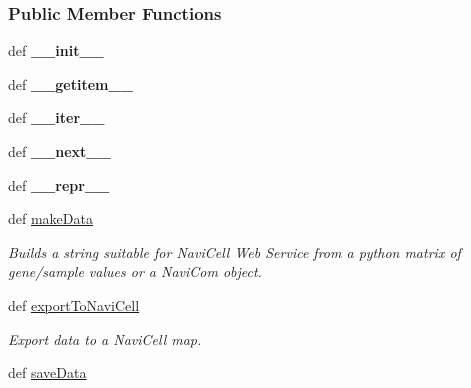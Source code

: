 \subsubsection*{Public Member Functions}
\begin{DoxyCompactItemize}
\item 
\hypertarget{classnavicom_1_1navidata_1_1NaviData_a7daecf05013e46441e7a2d2c935e7a87}{
def {\bfseries \_\-\_\-init\_\-\_\-}}
\label{classnavicom_1_1navidata_1_1NaviData_a7daecf05013e46441e7a2d2c935e7a87}

\item 
\hypertarget{classnavicom_1_1navidata_1_1NaviData_aa01878cdfddf20a588a5ecb48aed373d}{
def {\bfseries \_\-\_\-getitem\_\-\_\-}}
\label{classnavicom_1_1navidata_1_1NaviData_aa01878cdfddf20a588a5ecb48aed373d}

\item 
\hypertarget{classnavicom_1_1navidata_1_1NaviData_a840a803d8e1057ef6702283e8c3033ec}{
def {\bfseries \_\-\_\-iter\_\-\_\-}}
\label{classnavicom_1_1navidata_1_1NaviData_a840a803d8e1057ef6702283e8c3033ec}

\item 
\hypertarget{classnavicom_1_1navidata_1_1NaviData_a45175594977364139b3ad8d0f20db010}{
def {\bfseries \_\-\_\-next\_\-\_\-}}
\label{classnavicom_1_1navidata_1_1NaviData_a45175594977364139b3ad8d0f20db010}

\item 
\hypertarget{classnavicom_1_1navidata_1_1NaviData_a5780b453b33b2f60b9e1dce6d204c545}{
def {\bfseries \_\-\_\-repr\_\-\_\-}}
\label{classnavicom_1_1navidata_1_1NaviData_a5780b453b33b2f60b9e1dce6d204c545}

\item 
def \hyperlink{classnavicom_1_1navidata_1_1NaviData_a0ad79f0fbf4ab86ca13255069bf98632}{makeData}
\begin{DoxyCompactList}\small\item\em Builds a string suitable for NaviCell Web Service from a python matrix of gene/sample values or a NaviCom object. \item\end{DoxyCompactList}\item 
\hypertarget{classnavicom_1_1navidata_1_1NaviData_a485fbc0ffff49b94f3736b2a0f8cb54e}{
def \hyperlink{classnavicom_1_1navidata_1_1NaviData_a485fbc0ffff49b94f3736b2a0f8cb54e}{exportToNaviCell}}
\label{classnavicom_1_1navidata_1_1NaviData_a485fbc0ffff49b94f3736b2a0f8cb54e}

\begin{DoxyCompactList}\small\item\em Export data to a NaviCell map. \item\end{DoxyCompactList}\item 
\hypertarget{classnavicom_1_1navidata_1_1NaviData_a3dfc92056e5fc254e80607cef39234bf}{
def \hyperlink{classnavicom_1_1navidata_1_1NaviData_a3dfc92056e5fc254e80607cef39234bf}{saveData}}
\label{classnavicom_1_1navidata_1_1NaviData_a3dfc92056e5fc254e80607cef39234bf}


\end{DoxyCompactItemize}
